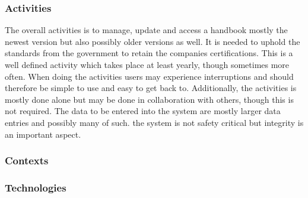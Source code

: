 \subsubsection*{Activities}
The overall activities is to manage, update and access a handbook mostly the newest version but also possibly older versions as well. It is needed to uphold the standards from the government to retain the companies certifications.
This is a well defined activity
which takes place at least yearly, though sometimes more often.
When doing the activities users may experience interruptions and should therefore be simple to use and easy to get back to.
Additionally, the activities is mostly done alone but may be done in collaboration with others, though this is not required.
\newline
The data to be entered into the system are mostly larger data entries and possibly many of such.
the system is not safety critical but integrity is an important aspect.

\subsubsection*{Contexts}


\subsubsection*{Technologies}














